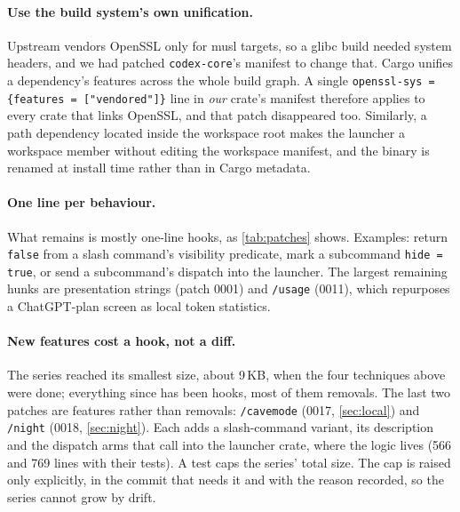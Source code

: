 \documentclass[11pt]{article}
\newcommand{\code}[1]{\texttt{#1}}
\begin{document}
\paragraph{Use the build system's own unification.} Upstream vendors OpenSSL only for musl targets,
so a glibc build needed system headers, and we had patched \code{codex-core}'s manifest to change
that. Cargo unifies a dependency's features across the whole build graph. A single
\code{openssl-sys = \{features = ["vendored"]\}} line in \emph{our} crate's manifest therefore
applies to every crate that links OpenSSL, and that patch disappeared too. Similarly, a path
dependency located inside the workspace root makes the launcher a workspace member without editing
the workspace manifest, and the binary is renamed at install time rather than in Cargo metadata.

\paragraph{One line per behaviour.} What remains is mostly one-line hooks, as
\cref{tab:patches} shows. Examples: return \code{false} from a slash command's visibility predicate,
mark a subcommand \code{hide = true}, or send a subcommand's dispatch into the launcher. The
largest remaining hunks are presentation strings (patch 0001) and \code{/usage} (0011), which
repurposes a ChatGPT-plan screen as local token statistics.

\paragraph{New features cost a hook, not a diff.} The series reached its smallest size, about
9\,KB, when the four techniques above were done; everything since has been hooks, most of them removals. The
last two patches are features rather than removals: \code{/cavemode} (0017, \cref{sec:local}) and
\code{/night} (0018, \cref{sec:night}). Each adds a slash-command variant, its description and the
dispatch arms that call into the launcher crate, where the logic lives (566 and 769 lines with their tests). A test
caps the series' total size. The cap is raised only explicitly, in the commit that needs it and
with the reason recorded, so the series cannot grow by drift.
\end{document}
